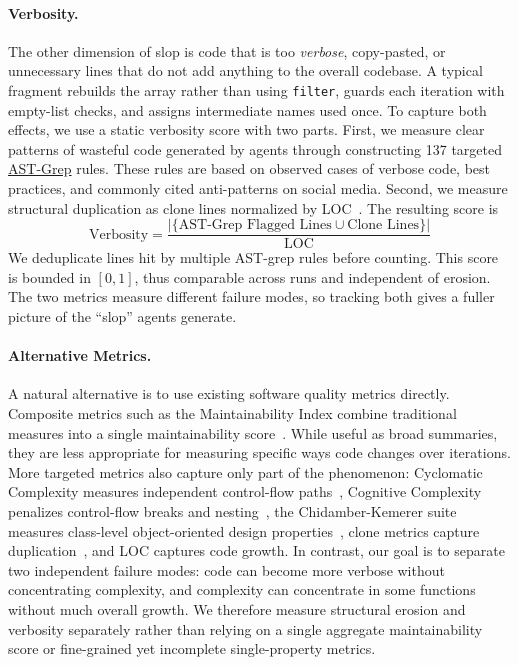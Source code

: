 \paragraph{Verbosity.} The other dimension of slop is code that is too \emph{verbose}, copy-pasted, or unnecessary lines that do not add anything to the overall codebase. A typical \codesearch{} fragment rebuilds the array rather than using \texttt{filter}, guards each iteration with empty-list checks, and assigns intermediate names used once. To capture both effects, we use a static verbosity score with two parts. First, we measure clear patterns of wasteful code generated by agents through constructing 137 targeted \href{https://ast-grep.github.io}{AST-Grep} rules. These rules are based on observed cases of verbose code, best practices, and commonly cited anti-patterns on social media. Second, we measure structural duplication as clone lines normalized by LOC~\citep{juergens2009code,Alam2023GPTCloneBenchA}. The resulting score is
\begin{equation}
\label{eq:verbosity}
\text{Verbosity}
= \frac{|\{\text{AST-Grep Flagged Lines} \cup \text{Clone Lines}\}|}{\text{LOC}}
\end{equation}
We deduplicate lines hit by multiple AST-grep rules before counting. This score is bounded in $[0,1]$, thus comparable across runs and independent of erosion. The two metrics measure different failure modes, so tracking both gives a fuller picture of the ``slop'' agents generate.

\paragraph{Alternative Metrics.}  A natural alternative is to use existing software quality metrics directly. Composite metrics such as the Maintainability Index combine traditional measures into a single maintainability score~\citep{oman1992maintainability}. While useful as broad summaries, they are less appropriate for measuring specific ways code changes over iterations. More targeted metrics also capture only part of the phenomenon: Cyclomatic Complexity measures independent control-flow paths~\citep{mccabe1976-complexity}, Cognitive Complexity penalizes control-flow breaks and nesting~\citep{campbell2018cognitive}, the Chidamber-Kemerer suite measures class-level object-oriented design properties~\citep{chidamber1994metrics}, clone metrics capture duplication~\citep{juergens2009code,Alam2023GPTCloneBenchA}, and LOC captures code growth. In contrast, our goal is to separate two independent failure modes: code can become more verbose without concentrating complexity, and complexity can concentrate in some functions without much overall growth. We therefore measure structural erosion and verbosity separately rather than relying on a single aggregate maintainability score or fine-grained yet incomplete single-property metrics.

